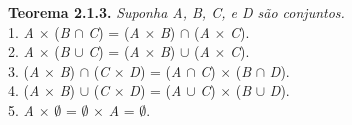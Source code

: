\textbf{Teorema 2.1.3.} \textit{Suponha A, B, C, e D são conjuntos.}
\\
1. \textit{A} $\times$ (\textit{B} $\cap$ \textit{C}) = (\textit{A} $\times$ \textit{B}) $\cap$ (\textit{A} $\times$ \textit{C}).
\\
2. \textit{A} $\times$ (\textit{B} $\cup$ \textit{C}) = (\textit{A} $\times$ \textit{B}) $\cup$ (\textit{A} $\times$ \textit{C}).
\\
3. (\textit{A} $\times$ \textit{B}) $\cap$ (\textit{C} $\times$ \textit{D}) = (\textit{A} $\cap$ \textit{C}) $\times$ (\textit{B}
$\cap$ \textit{D}).
\\
4. (\textit{A} $\times$ \textit{B}) $\cup$ (\textit{C} $\times$ \textit{D}) = (\textit{A} $\cup$ \textit{C}) $\times$ (\textit{B}
$\cup$ \textit{D}).
\\
5. \textit{A} $\times$ $\emptyset$ = $\emptyset$ $\times$ \textit{A} = $\emptyset$.  